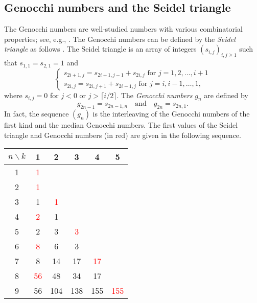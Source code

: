 \documentclass[reqno,12pt]{amsart}
\theoremstyle{definition}
\theoremstyle{remark}
\newcommand\qand{\quad\mbox{and}\quad}
\begin{document}
\subsection{Genocchi numbers and the Seidel triangle}
The Genocchi numbers are well-studied numbers with various combinatorial
properties; see, e.g., \cite{Dum74, LW20}. The Genocchi numbers can be defined
by the \emph{Seidel triangle} as follows \cite{Sei77}.
The Seidel triangle is an array of integers $(s_{i,j})_{i,j\ge1}$
such that $s_{1,1}=s_{2,1}=1$ and
\[
  \begin{cases}
    s_{2i+1,j} = s_{2i+1,j-1} + s_{2i,j} \mbox{ for } j=1,2,\dots, i+1\\
    s_{2i,j} = s_{2i,j+1} + s_{2i-1,j} \mbox{ for } j=i,i-1,\dots,1,
  \end{cases}
\]
where $s_{i,j}=0$ for $j<0$ or $j>\lceil i/2\rceil$.
The \emph{Genocchi numbers} $g_n$ are defined by
\[
  g_{2n-1}=s_{2n-1,n} \qand g_{2n}=s_{2n,1}.
\]
In fact, the sequence $(g_n)$ is the interleaving of the Genocchi numbers of
the first kind and the median Genocchi numbers.
The first values of the Seidel triangle and Genocchi numbers (in red)
are given in the following sequence. 

\begin{center}
  \begin{tabular}{c|ccccc}
    \( n\backslash k \) & 1 & 2 & 3 & 4 & 5 \\ \hline
    1 & \textcolor{red}{1} & & & & \\
    2 & \textcolor{red}{1} & & & & \\
    3 & 1 & \textcolor{red}{1} & & & \\
    4 & \textcolor{red}{2} & 1 & & & \\
    5 & 2 & 3 & \textcolor{red}{3} & & \\
    6 & \textcolor{red}{8} & 6 & 3 & & \\ 
    7 & 8 & 14 & 17 & \textcolor{red}{17} & \\
    8 & \textcolor{red}{56} & 48 & 34 & 17 &\\
    9 & 56 & 104 & 138 & 155 & \textcolor{red}{155}\\
  \end{tabular}
\end{center}
\end{document}
